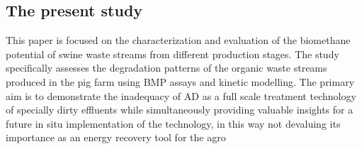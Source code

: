 \subsection{The present study}
This paper is focused on the characterization and evaluation of the biomethane potential of swine waste streams from different production stages. The study specifically assesses the degradation patterns of the organic waste streams produced in the pig farm using BMP assays and kinetic modelling. The primary aim is to demonstrate the inadequacy of AD as a full scale treatment technology of specially dirty effluents while simultaneously providing valuable insights for a future in situ implementation of the technology, in this way not devaluing its importance as an energy recovery tool for the agro
